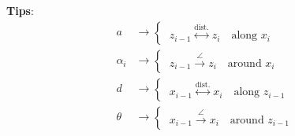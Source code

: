\vspace*{10pt}
\textbf{Tips}:
\begin{align*}
a &\rightarrow
\begin{cases}
\ z_{i-1} \overset{\text{dist.}}{\longleftrightarrow} z_i \quad \text{along } x_i
\end{cases}\\
%
\alpha_i &\rightarrow
\begin{cases}
\ z_{i-1} \overset{\angle}{\longrightarrow} z_i \quad \text{around } x_i
\end{cases}\\
%
d &\rightarrow
\begin{cases}
\ x_{i-1} \overset{\text{dist.}}{\longleftrightarrow} x_i \quad \text{along } z_{i-1}
\end{cases}\\
%
\theta &\rightarrow
\begin{cases}
\ x_{i-1} \overset{\angle}{\longrightarrow} x_i \quad \text{around } z_{i-1}
\end{cases}
\end{align*}
\vspace*{-15pt}
